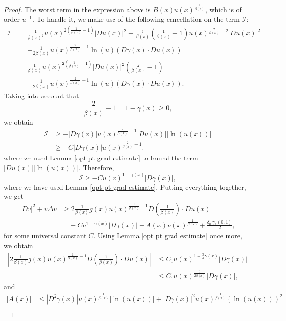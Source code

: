 \documentclass[reqno,11pt]{amsart}
\newcommand{\1}{\mathds{1}}
\numberwithin{equation}{section}
\begin{document}
\begin{proof}
The worst term in the expression above is $B(x) u(x)^{\frac{1}{\beta(x)}}$, which is of order $u^{-1}$. To handle it, we make use of the following cancellation on the term $\mathcal{I}$:
\begin{eqnarray*}
	\mathcal{I} & = & \frac{1}{\beta(x)^2}u(x)^{2\left(\frac{1}{\beta(x)}-1\right)}|Du(x)|^2 + \frac{1}{\beta(x)}\left(\frac{1}{\beta(x)}-1 \right)u(x)^{\frac{2}{\beta(x)}-2}|Du(x)|^2\\
	& & - \frac{1}{2\beta(x)}u(x)^{\frac{2}{\beta(x)}-1}\ln(u) \left(D\gamma(x)\cdot Du(x)\right)\\
	& = & \frac{1}{\beta(x)}u(x)^{2\left(\frac{1}{\beta(x)}-1\right)}|Du(x)|^2\left(\frac{2}{\beta(x)} - 1 \right)\\
	& & - \frac{1}{2\beta(x)}u(x)^{\frac{2}{\beta(x)}-1}\ln(u) \left(D\gamma(x)\cdot Du(x)\right).
\end{eqnarray*}
Taking into account that 
$$
	\frac{2}{\beta(x)} - 1  = 1 - \gamma(x) \geq 0,
$$
we obtain
\begin{align*}
   \mathcal{I} & \geq -|D\gamma(x)|u(x)^{\frac{2}{\beta(x)}-1}|Du(x)||\ln(u(x))|\\
               & \geq - C |D\gamma(x)|u(x)^{\frac{2}{\beta(x)}-1},               
\end{align*}
where we used Lemma \ref{opt pt grad estimate} to bound the term $|Du(x)||\ln(u(x))|$. Therefore,
$$
	\mathcal{I} \geq -Cu(x)^{1-\gamma(x)}|D\gamma(x)|,
$$
where we have used Lemma \ref{opt pt grad estimate}. Putting everything together, we get
\begin{align*}
         |Dv|^2 + v \Delta v & \geq  \displaystyle  2\frac{1}{\beta(x)}g(x)u(x)^{\frac{1}{\beta(x)} - 1}D\left(\frac{1}{\beta(x)}\right) \cdot Du(x)\\
         & \quad - Cu^{1-\gamma(x)}|D\gamma(x)|  + A(x)u(x)^{\frac{1}{\beta(x)}} + \frac{\delta_0 \, \gamma_\ast (0,1)}{2},
\end{align*}
for some universal constant $C$. Using Lemma \ref{opt pt grad estimate} once more, we obtain
\begin{align*}
    \left|2 \frac{1}{\beta(x)} g(x)u(x)^{\frac{1}{\beta(x)} - 1} D\left(\frac{1}{\beta(x)} \right) \cdot Du(x)  \right|& \leq  C_1 u(x)^{1-\frac{3}{4}\gamma(x)} |D\gamma(x)|\\
    & \leq C_1 u(x)^{\frac{1}{2\beta(x)}}|D\gamma(x)|,
\end{align*}
and
\begin{align*}
	|A(x)| & \leq  |D^2\gamma(x)|u(x)^{\frac{1}{\beta(x)}}|\ln(u(x))| + |D\gamma(x)|^2u(x)^{\frac{1}{\beta(x)}}(\ln(u(x)))^2\\

\end{align*}
\end{proof}
\end{document}
